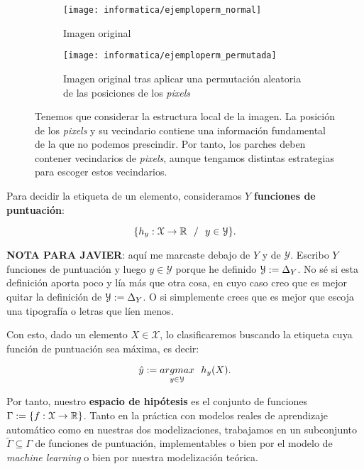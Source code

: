 \begin{figure}[!hbtp]
	\centering
	\ajustarsubcaptions
	\begin{subfigure}[t]{0.45\textwidth}
		\centering
		\texttt{[image: informatica/ejemploperm\_normal]}
		\caption{Imagen original}
	\end{subfigure}
	\begin{subfigure}[t]{0.45\textwidth}
		\centering
		\texttt{[image: informatica/ejemploperm\_permutada]}
		\caption{Imagen original tras aplicar una permutación aleatoria de las posiciones de los \textit{pixels}}
	\end{subfigure}
	\caption{Tenemos que considerar la estructura local de la imagen. La posición de los \textit{pixels} y su vecindario contiene una información fundamental de la que no podemos prescindir. Por tanto, los parches deben contener vecindarios de \textit{pixels}, aunque tengamos distintas estrategias para escoger estos vecindarios.}
	\label{img:desordenar_pixeles_repetida_mates}
\end{figure}

Para decidir la etiqueta de un elemento, consideramos $Y$ \textbf{funciones de puntuación}:

\begin{equation}
	\{ h_y: \mathcal{X} \to \mathbb{R} \ \  / \ \  y \in \mathcal{Y} \}.
\end{equation}

\textbf{NOTA PARA JAVIER}: aquí me marcaste debajo de $Y$ y de $\mathcal{Y}$. Escribo $Y$ funciones de puntuación y luego $y \in \mathcal{Y}$ porque he definido $\mathcal{Y} := \Delta_{Y}$. No sé si esta definición aporta poco y lía más que otra cosa, en cuyo caso creo que es mejor quitar la definición de $\mathcal{Y} := \Delta_{Y}$. O si simplemente crees que es mejor que escoja una tipografía o letras que líen menos.

Con esto, dado un elemento $X \in \mathcal{X}$, lo clasificaremos buscando la etiqueta cuya función de puntuación sea máxima, es decir:

$$\hat{y} := \underset{y \in \mathcal{Y}}{argmax} \ \  h_y(X).$$

Por tanto, nuestro \textbf{espacio de hipótesis} es el conjunto de funciones $\Gamma := \{ f: \mathcal{X} \to \mathbb{R} \}$. Tanto en la práctica con modelos reales de aprendizaje automático como en nuestras dos modelizaciones, trabajamos en un subconjunto $\tilde{\Gamma} \subseteq \Gamma$ de funciones de puntuación, implementables o bien por el modelo de \textit{machine learning} o bien por nuestra modelización teórica.

